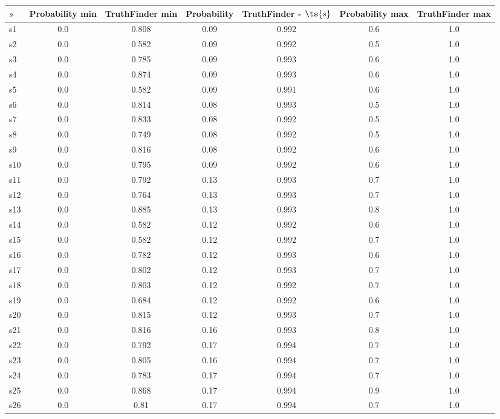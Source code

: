 \documentclass{article}
\begin{document}
\noindent\begin{tabular}{|l|c|c|c|c|c|c|}
\hline
$s$& Probability min & TruthFinder min & Probability & TruthFinder - $\ts{s}$ & Probability max & TruthFinder max\\
\hline
s1 &0.0 & 0.808 & 0.09 & 0.992 & 0.6 & 1.0\\
\hline
s2 &0.0 & 0.582 & 0.09 & 0.992 & 0.5 & 1.0\\
\hline
s3 &0.0 & 0.785 & 0.09 & 0.993 & 0.6 & 1.0\\
\hline
s4 &0.0 & 0.874 & 0.09 & 0.993 & 0.6 & 1.0\\
\hline
s5 &0.0 & 0.582 & 0.09 & 0.991 & 0.6 & 1.0\\
\hline
s6 &0.0 & 0.814 & 0.08 & 0.993 & 0.5 & 1.0\\
\hline
s7 &0.0 & 0.833 & 0.08 & 0.992 & 0.5 & 1.0\\
\hline
s8 &0.0 & 0.749 & 0.08 & 0.992 & 0.5 & 1.0\\
\hline
s9 &0.0 & 0.816 & 0.08 & 0.992 & 0.6 & 1.0\\
\hline
s10 &0.0 & 0.795 & 0.09 & 0.992 & 0.6 & 1.0\\
\hline
s11 &0.0 & 0.792 & 0.13 & 0.993 & 0.7 & 1.0\\
\hline
s12 &0.0 & 0.764 & 0.13 & 0.993 & 0.7 & 1.0\\
\hline
s13 &0.0 & 0.885 & 0.13 & 0.993 & 0.8 & 1.0\\
\hline
s14 &0.0 & 0.582 & 0.12 & 0.992 & 0.6 & 1.0\\
\hline
s15 &0.0 & 0.582 & 0.12 & 0.992 & 0.7 & 1.0\\
\hline
s16 &0.0 & 0.782 & 0.12 & 0.993 & 0.6 & 1.0\\
\hline
s17 &0.0 & 0.802 & 0.12 & 0.993 & 0.7 & 1.0\\
\hline
s18 &0.0 & 0.803 & 0.12 & 0.992 & 0.7 & 1.0\\
\hline
s19 &0.0 & 0.684 & 0.12 & 0.992 & 0.6 & 1.0\\
\hline
s20 &0.0 & 0.815 & 0.12 & 0.993 & 0.7 & 1.0\\
\hline
s21 &0.0 & 0.816 & 0.16 & 0.993 & 0.8 & 1.0\\
\hline
s22 &0.0 & 0.792 & 0.17 & 0.994 & 0.7 & 1.0\\
\hline
s23 &0.0 & 0.805 & 0.16 & 0.994 & 0.7 & 1.0\\
\hline
s24 &0.0 & 0.783 & 0.17 & 0.994 & 0.7 & 1.0\\
\hline
s25 &0.0 & 0.868 & 0.17 & 0.994 & 0.9 & 1.0\\
\hline
s26 &0.0 & 0.81 & 0.17 & 0.994 & 0.7 & 1.0\\

\end{tabular}
\end{document}
